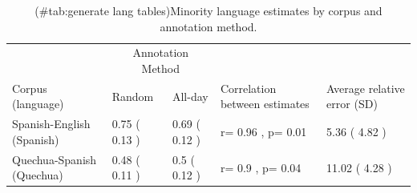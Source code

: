 \documentclass[
]{article}
\begin{document}
\begin{table}[!h]

\caption{(\#tab:generate lang tables)Minority language estimates by corpus and annotation method.}
\centering
\begin{tabular}[t]{lllll}
\toprule
\multicolumn{1}{c}{ } & \multicolumn{2}{c}{Annotation Method} & \multicolumn{2}{c}{ } \\
\cmidrule(l{3pt}r{3pt}){2-3}
Corpus (language) & Random & All-day & Correlation between estimates & Average relative error (SD)\\
\midrule
Spanish-English (Spanish) & 0.75 ( 0.13 ) & 0.69 ( 0.12 ) & r= 0.96 , p= 0.01 & 5.36 ( 4.82 )\\
Quechua-Spanish (Quechua) & 0.48 ( 0.11 ) & 0.5 ( 0.12 ) & r= 0.9 , p= 0.04 & 11.02 ( 4.28 )\\
\bottomrule
\end{tabular}
\end{table}
\end{document}
